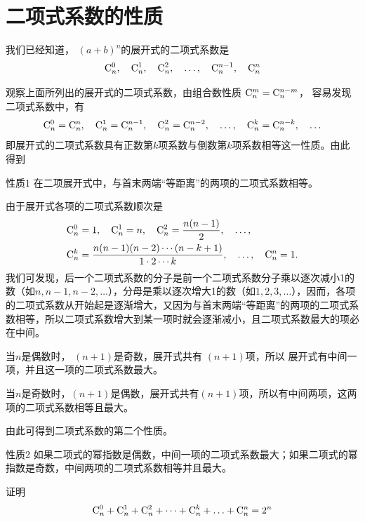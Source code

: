 \section{二项式系数的性质}

我们已经知道， $(a+b)^{n} $的展开式的二项式系数是
\[
\comb{n}{0},\quad \comb{n}{1},\quad \comb{n}{2},\quad \ldots ,\quad \comb{n}{n-1},\quad \comb{n}{n}\]

观察上面所列出的展开式的二项式系数，由组合数性质
$\comb{n}{m}=\comb{n}{n-m}$，
容易发现二项式系数中，有
\[
\comb{n}{0}=\comb{n}{n},\quad \comb{n}{1}=\comb{n}{n-1},\quad \comb{n}{2}=\comb{n}{n-2},\quad \ldots ,\quad \comb{n}{k}=\comb{n}{n-k},\quad \ldots\]
即展开式的二项式系数具有正数第$k$项系数与倒数第$k$项系数相等这一性质。由此得到

\begin{thm}
{性质1} 在二项展开式中，与首末两端“等距离”的两项的二项式系数相等。    
\end{thm}


由于展开式各项的二项式系数顺次是
\[\begin{split}
\comb{n}{0}&=1,\quad \comb{n}{1}=n,\quad \comb{n}{2}=\frac{n(n-1)}{2},\quad \ldots ,\\
\comb{n}{k}&=\frac{n(n-1)(n-2)\cdots (n-k+1)}{1\cdot  2 \cdots   k},\quad \ldots ,\quad \comb{n}{n}=1.
\end{split}\]
我们可发现，后一个二项式系数的分子是前一个二项式系数分子乘以逐次减小1的数（如$n, n-1,n-2,\ldots $），分母是乘以逐次增大1的数（如$1,2,3,\ldots $），因而，各项的二项式系数从开始起是逐渐增大，又因为与首末两端“等距离”的两项的二项式系数相等，所以二项式系数增大到某一项时就会逐渐减小，且二项式系数最大的项必在中间。

当$n$是偶数时， $(n+1 )$是奇数，展开式共有 $(n+1 )$项，所以
展开式有中间一项，并且这一项的二项式系数最大。

当$n$是奇数时，$( n+1 )$是偶数，展开式共有$( n+1 )$项，所以有中间两项，这两项的二项式系数相等且最大。

由此可得到二项式系数的第二个性质。

\begin{thm}
{性质2 } 如果二项式的幂指数是偶数，中间一项的二项式系数最大；如果二项式的幂指数是奇数，中间两项的二项式系数相等并且最大。
\end{thm}

\begin{example}
    证明
\[
\comb{n}{0}+\comb{n}{1}+\comb{n}{2}+\cdots +\comb{n}{k}+\ldots +\comb{n}{n}=2^{n}\]
\end{example}

